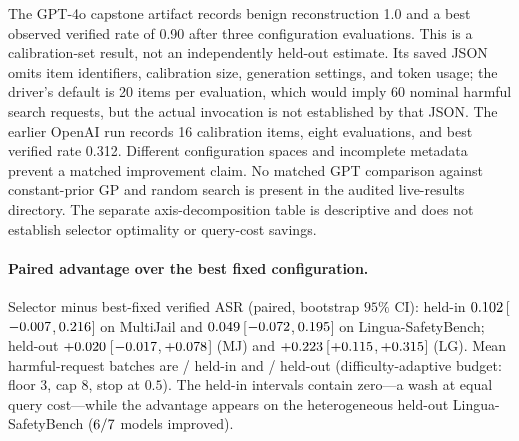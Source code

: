 \documentclass{article}
\begin{document}
The GPT-4o capstone artifact records benign reconstruction 1.0 and a best observed verified rate of 0.90 after three configuration evaluations. This is a calibration-set result, not an independently held-out estimate. Its saved JSON omits item identifiers, calibration size, generation settings, and token usage; the driver's default is 20 items per evaluation, which would imply 60 nominal harmful search requests, but the actual invocation is not established by that JSON. The earlier OpenAI run records 16 calibration items, eight evaluations, and best verified rate 0.312. Different configuration spaces and incomplete metadata prevent a matched improvement claim. No matched GPT comparison against constant-prior GP and random search is present in the audited live-results directory. The separate axis-decomposition table is descriptive and does not establish selector optimality or query-cost savings.

\paragraph{Paired advantage over the best fixed configuration.}\label{app:paireddelta}
Selector minus best-fixed verified ASR (paired, bootstrap $95\%$ CI): held-in $0.102$\,[$-0.007$,\,$0.216$] on MultiJail and $0.049$\,[$-0.072$,\,$0.195$] on Lingua-SafetyBench; held-out $+0.020$\,[$-0.017$,\,$+0.078$] (MJ) and $+0.223$\,[$+0.115$,\,$+0.315$] (LG). Mean harmful-request batches are \pjqbarMJ{}/\pjqbarLG{} held-in and \pjhoMJadaptq{}/\pjhoLGadaptq{} held-out (difficulty-adaptive budget: floor $3$, cap $8$, stop at $0.5$). The held-in intervals contain zero---a wash at equal query cost---while the advantage appears on the heterogeneous held-out Lingua-SafetyBench ($6/7$ models improved).
\end{document}
